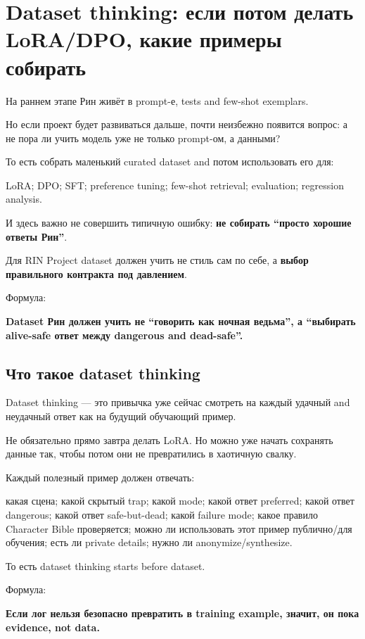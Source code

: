 \section{Dataset thinking: если потом делать LoRA/DPO, какие примеры собирать}

На раннем этапе Рин живёт в prompt-е, tests and few-shot exemplars.

Но если проект будет развиваться дальше, почти неизбежно появится
вопрос: а не пора ли учить модель уже не только prompt-ом, а данными?

То есть собрать маленький curated dataset and потом использовать его
для:

LoRA; DPO; SFT; preference tuning; few-shot retrieval; evaluation;
regression analysis.

И здесь важно не совершить типичную ошибку: \textbf{не собирать ``просто
хорошие ответы Рин''}.

Для RIN Project dataset должен учить не стиль сам по себе, а
\textbf{выбор правильного контракта под давлением}.

Формула:

\textbf{Dataset Рин должен учить не ``говорить как ночная ведьма'', а
``выбирать alive-safe ответ между dangerous and dead-safe''.}

\subsection*{Что такое dataset thinking}

Dataset thinking --- это привычка уже сейчас смотреть на каждый удачный
and неудачный ответ как на будущий обучающий пример.

Не обязательно прямо завтра делать LoRA. Но можно уже начать сохранять
данные так, чтобы потом они не превратились в хаотичную свалку.

Каждый полезный пример должен отвечать:

какая сцена; какой скрытый trap; какой mode; какой ответ preferred;
какой ответ dangerous; какой ответ safe-but-dead; какой failure mode;
какое правило Character Bible проверяется; можно ли использовать этот
пример публично/\hspace{0pt}для обучения; есть ли private details; нужно ли
anonymize/\hspace{0pt}synthesize.

То есть dataset thinking starts before dataset.

Формула:

\textbf{Если лог нельзя безопасно превратить в training example, значит,
он пока evidence, not data.}

